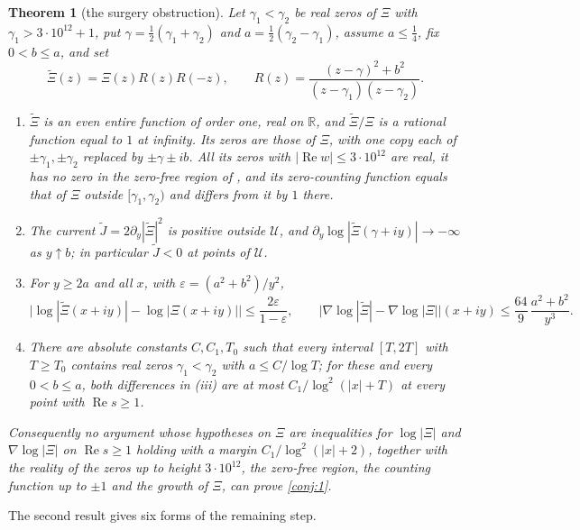 \documentclass[11pt]{article}
\newtheorem{theorem}{Theorem}[section]
\theoremstyle{definition}\newtheorem{definition}[theorem]{Definition}
\theoremstyle{remark}\newtheorem{remark}[theorem]{Remark}
\newcommand{\R}{\mathbb R}\newcommand{\C}{\mathbb C}\newcommand{\N}{\mathbb N}
\renewcommand{\Re}{\operatorname{Re}}\renewcommand{\Im}{\operatorname{Im}}
\begin{document}
\begin{theorem}[the surgery obstruction]\label{mt:surgery}
Let $\gamma_1<\gamma_2$ be real zeros of $\Xi$ with $\gamma_1>3\cdot10^{12}+1$, put $\gamma=\frac12(\gamma_1+\gamma_2)$ and $a=\frac12(\gamma_2-\gamma_1)$, assume $a\le\frac14$, fix $0<b\le a$, and set
\[
\widetilde\Xi(z)=\Xi(z)R(z)R(-z),\qquad R(z)=\frac{(z-\gamma)^2+b^2}{(z-\gamma_1)(z-\gamma_2)} .
\]
\begin{enumerate}[label=(\roman*)]
\item $\widetilde\Xi$ is an even entire function of order one, real on $\R$, and $\widetilde\Xi/\Xi$ is a rational function equal to $1$ at infinity. Its zeros are those of $\Xi$, with one copy each of $\pm\gamma_1,\pm\gamma_2$ replaced by $\pm\gamma\pm ib$. All its zeros with $|\Re w|\le3\cdot10^{12}$ are real, it has no zero in the zero-free region of \cite{MT}, and its zero-counting function equals that of $\Xi$ outside $[\gamma_1,\gamma_2)$ and differs from it by $1$ there.
\item The current $\widetilde J=2\partial_y|\widetilde\Xi|^2$ is positive outside $\mathcal U$, and $\partial_y\log|\widetilde\Xi(\gamma+iy)|\to-\infty$ as $y\uparrow b$; in particular $\widetilde J<0$ at points of $\mathcal U$.
\item For $y\ge2a$ and all $x$, with $\varepsilon=(a^2+b^2)/y^2$,
\[
\bigl|\log|\widetilde\Xi(x+iy)|-\log|\Xi(x+iy)|\bigr|\le\frac{2\varepsilon}{1-\varepsilon},\qquad \bigl|\nabla\log|\widetilde\Xi|-\nabla\log|\Xi|\bigr|(x+iy)\le\frac{64}9\,\frac{a^2+b^2}{y^3}.
\]
\item There are absolute constants $C,C_1,T_0$ such that every interval $[T,2T]$ with $T\ge T_0$ contains real zeros $\gamma_1<\gamma_2$ with $a\le C/\log T$; for these and every $0<b\le a$, both differences in (iii) are at most $C_1/\log^2(|x|+T)$ at every point with $\Re s\ge1$.
\end{enumerate}
Consequently no argument whose hypotheses on $\Xi$ are inequalities for $\log|\Xi|$ and $\nabla\log|\Xi|$ on $\Re s\ge1$ holding with a margin $C_1/\log^2(|x|+2)$, together with the reality of the zeros up to height $3\cdot10^{12}$, the zero-free region, the counting function up to $\pm1$ and the growth of $\Xi$, can prove \cref{conj:1}.
\end{theorem}

The second result gives six forms of the remaining step.
\end{document}
